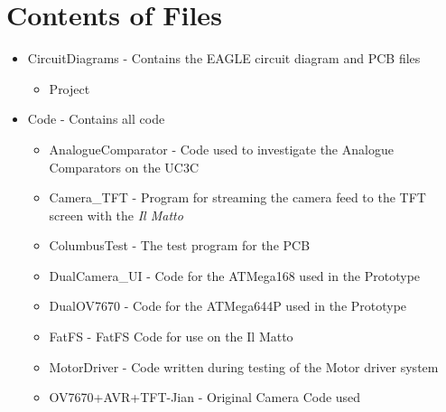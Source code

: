 \chapter{Contents of Files} \label{Appendix:Contents}
\begin{itemize}
\item CircuitDiagrams - Contains the EAGLE circuit diagram and PCB files
\begin{itemize}
\item Project
\end{itemize}
\item Code - Contains all code
\begin{itemize}
\item AnalogueComparator - Code used to investigate the Analogue Comparators on the UC3C
\item Camera\_TFT - Program for streaming the camera feed to the TFT screen with the \textit{Il Matto}
\item ColumbusTest - The test program for the PCB
\item DualCamera\_UI - Code for the ATMega168 used in the Prototype
\item DualOV7670 - Code for the ATMega644P used in the Prototype
\item FatFS - FatFS Code for use on the Il Matto 
\item MotorDriver - Code written during testing of the Motor driver system
\item OV7670+AVR+TFT-Jian - Original Camera Code used

\end{itemize}
\end{itemize}
